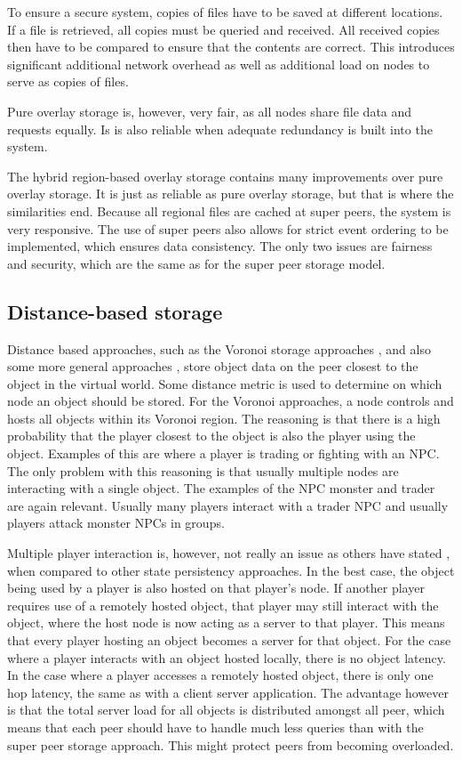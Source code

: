\documentclass[journal,oneside,a4paper,onecolumn]{IEEEtran}
\begin{document}
To ensure a secure system, copies of files have to be saved at different locations. If a file is retrieved, all copies must be queried and received. All received copies then have to be compared to ensure that the contents are correct. This introduces significant additional network overhead as well as additional load on nodes to serve as copies of files.

Pure overlay storage is, however, very fair, as all nodes share file data and requests equally. Is is also reliable when adequate redundancy is built into the system.

The hybrid region-based overlay storage contains many improvements over pure overlay storage. It is just as reliable as pure overlay storage, but that is where the similarities end. Because all regional files are cached at super peers, the system is very responsive. The use of super peers also allows for strict event ordering to be implemented, which ensures data consistency. The only two issues are fairness and security, which are the same as for the super peer storage model.

\subsection{Distance-based storage}

Distance based approaches, such as the Voronoi storage approaches \cite{Buyukkaya_voronoi_state_management}, \cite{Hu_voronoi_IM} and also some more general approaches \cite{colyseus_distance_based}, store object data on the peer closest to the object in the virtual world. Some distance metric is used to determine on which node an object should be stored. For the Voronoi approaches, a node controls and hosts all objects within its Voronoi region. The reasoning is that there is a high probability that the player closest to the object is also the player using the object. Examples of this are where a player is trading or fighting with an NPC. The only problem with this reasoning is that usually multiple nodes are interacting with a single object. The examples of the NPC monster and trader are again relevant. Usually many players interact with a trader NPC and usually players attack monster NPCs in groups.

Multiple player interaction is, however, not really an issue as others have stated \cite{}, when compared to other state persistency approaches. In the best case, the object being used by a player is also hosted on that player's node. If another player requires use of a remotely hosted object, that player may still interact with the object, where the host node is now acting as a server to that player. This means that every player hosting an object becomes a server for that object. For the case where a player interacts with an object hosted locally, there is no object latency. In the case where a player accesses a remotely hosted object, there is only one hop latency, the same as with a client server application. The advantage however is that the total server load for all objects is distributed amongst all peer, which means that each peer should have to handle much less queries than with the super peer storage approach. This might protect peers from becoming overloaded.
\end{document}
